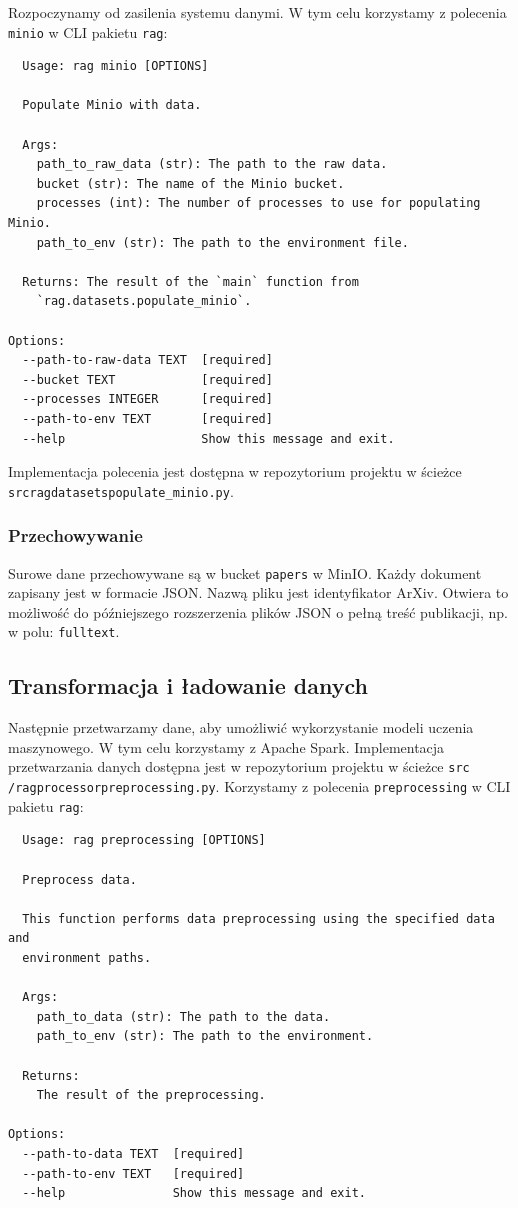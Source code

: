 \documentclass[10pt]{article}
\begin{document}
Rozpoczynamy od zasilenia systemu danymi. W tym celu korzystamy z polecenia \texttt{minio} w CLI pakietu \texttt{rag}:
\begin{lstlisting}
  Usage: rag minio [OPTIONS]

  Populate Minio with data.

  Args:
    path_to_raw_data (str): The path to the raw data.
    bucket (str): The name of the Minio bucket.
    processes (int): The number of processes to use for populating Minio.
    path_to_env (str): The path to the environment file.

  Returns: The result of the `main` function from 
    `rag.datasets.populate_minio`.

Options:
  --path-to-raw-data TEXT  [required]
  --bucket TEXT            [required]
  --processes INTEGER      [required]
  --path-to-env TEXT       [required]
  --help                   Show this message and exit.
\end{lstlisting}

Implementacja polecenia jest dostępna w repozytorium projektu w ścieżce \texttt{src\/rag\/datasets\/populate\_minio.py}.

\subsubsection{Przechowywanie}

Surowe dane przechowywane są w bucket \texttt{papers} w MinIO. Każdy dokument zapisany jest w formacie JSON. Nazwą pliku jest identyfikator ArXiv. Otwiera to możliwość do późniejszego rozszerzenia plików JSON o pełną treść publikacji, np. w polu: \texttt{fulltext}.

\subsection{Transformacja i ładowanie danych}

Następnie przetwarzamy dane, aby umożliwić wykorzystanie modeli uczenia maszynowego. W tym celu korzystamy z Apache Spark. Implementacja przetwarzania danych dostępna jest w repozytorium projektu w ścieżce \texttt{src\\/rag\/processor\/preprocessing.py}. Korzystamy z polecenia \texttt{preprocessing} w CLI pakietu \texttt{rag}:

\begin{lstlisting}
  Usage: rag preprocessing [OPTIONS]

  Preprocess data.

  This function performs data preprocessing using the specified data and
  environment paths.

  Args:
    path_to_data (str): The path to the data.
    path_to_env (str): The path to the environment.

  Returns: 
    The result of the preprocessing.

Options:
  --path-to-data TEXT  [required]
  --path-to-env TEXT   [required]
  --help               Show this message and exit.
\end{lstlisting}
\end{document}
